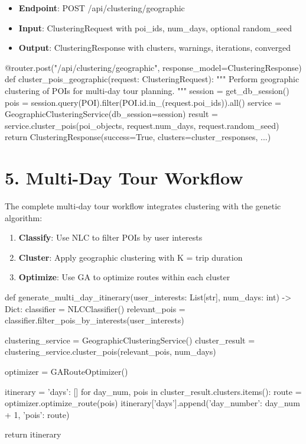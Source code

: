 \begin{itemize}
\item \textbf{Endpoint}: POST /api/clustering/geographic
\item \textbf{Input}: ClusteringRequest with poi\_ids, num\_days, optional random\_seed
\item \textbf{Output}: ClusteringResponse with clusters, warnings, iterations, converged
\end{itemize}

\begin{python}
@router.post("/api/clustering/geographic", response_model=ClusteringResponse)
def cluster_pois_geographic(request: ClusteringRequest):
    """
    Perform geographic clustering of POIs for multi-day tour planning.
    """
    session = get_db_session()
    pois = session.query(POI).filter(POI.id.in_(request.poi_ids)).all()
    service = GeographicClusteringService(db_session=session)
    result = service.cluster_pois(poi_objects, request.num_days, request.random_seed)
    return ClusteringResponse(success=True, clusters=cluster_responses, ...)
\end{python}

\section{5. Multi-Day Tour Workflow}

The complete multi-day tour workflow integrates clustering with the genetic algorithm:

\begin{enumerate}
\item \textbf{Classify}: Use NLC to filter POIs by user interests
\item \textbf{Cluster}: Apply geographic clustering with K = trip duration
\item \textbf{Optimize}: Use GA to optimize routes within each cluster
\end{enumerate}

\begin{python}
def generate_multi_day_itinerary(user_interests: List[str], 
                                 num_days: int) -> Dict:
    classifier = NLCClassifier()
    relevant_pois = classifier.filter_pois_by_interests(user_interests)
    
    clustering_service = GeographicClusteringService()
    cluster_result = clustering_service.cluster_pois(relevant_pois, num_days)
    
    optimizer = GARouteOptimizer()
    
    itinerary = {'days': []}
    for day_num, pois in cluster_result.clusters.items():
        route = optimizer.optimize_route(pois)
        itinerary['days'].append({'day_number': day_num + 1, 'pois': route})
    
    return itinerary
\end{python}

